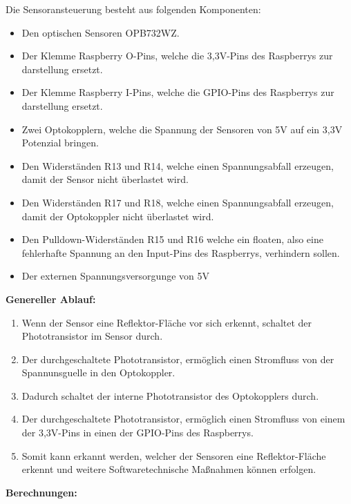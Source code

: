 Die Sensoransteuerung besteht aus folgenden Komponenten:
\begin{itemize}
\item Den optischen Sensoren OPB732WZ.
\item Der Klemme Raspberry O-Pins, welche die 3,3V-Pins des Raspberrys zur darstellung ersetzt.
\item Der Klemme Raspberry I-Pins, welche die GPIO-Pins des Raspberrys zur darstellung ersetzt.
\item Zwei Optokopplern, welche die Spannung der Sensoren von 5V auf ein 3,3V Potenzial bringen.
\item Den Widerständen R13 und R14, welche einen Spannungsabfall erzeugen, damit der Sensor nicht überlastet wird.
\item Den Widerständen R17 und R18, welche einen Spannungsabfall erzeugen, damit der Optokoppler nicht überlastet wird.
\item Den Pulldown-Widerständen R15 und R16 welche ein floaten, also eine fehlerhafte Spannung an den Input-Pins des Raspberrys, verhindern sollen.
\item Der externen Spannungsversorgunge von 5V\\
\end{itemize}
\textbf{Genereller Ablauf:}
\begin{enumerate}
\item Wenn der Sensor eine Reflektor-Fläche vor sich erkennt, schaltet der Phototransistor im Sensor durch.
\item Der durchgeschaltete Phototransistor, ermöglich einen Stromfluss von der Spannunsguelle in den Optokoppler.
\item Dadurch schaltet der interne Phototransistor des Optokopplers durch.
\item Der durchgeschaltete Phototransistor, ermöglich einen Stromfluss von einem der 3,3V-Pins in einen der GPIO-Pins des Raspberrys.
\item Somit kann erkannt werden, welcher der Sensoren eine Reflektor-Fläche erkennt und weitere Softwaretechnische Maßnahmen können erfolgen.
\end{enumerate}
\textbf{Berechnungen:}
